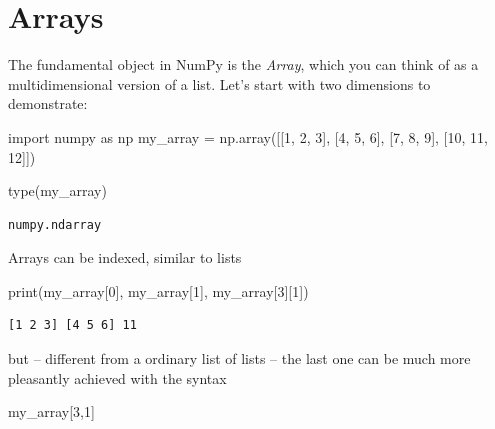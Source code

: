 \documentclass[
  letterpaper,
  DIV=11,
  numbers=noendperiod]{scrreprt}
\newenvironment{Shaded}{\begin{snugshade}}{\end{snugshade}}
\newcommand{\BuiltInTok}[1]{\textcolor[rgb]{0.00,0.23,0.31}{#1}}
\newcommand{\DecValTok}[1]{\textcolor[rgb]{0.68,0.00,0.00}{#1}}
\newcommand{\ImportTok}[1]{\textcolor[rgb]{0.00,0.46,0.62}{#1}}
\newcommand{\NormalTok}[1]{\textcolor[rgb]{0.00,0.23,0.31}{#1}}
\newcommand{\OperatorTok}[1]{\textcolor[rgb]{0.37,0.37,0.37}{#1}}
\theoremstyle{definition}
\theoremstyle{remark}
\begin{document}
\hypertarget{arrays}{%
\section{Arrays}\label{arrays}}

The fundamental object in NumPy is the \emph{Array}, which you can think
of as a multidimensional version of a list. Let's start with two
dimensions to demonstrate:

\begin{Shaded}
\begin{Highlighting}[]
\ImportTok{import}\NormalTok{ numpy }\ImportTok{as}\NormalTok{ np}
\NormalTok{my\_array }\OperatorTok{=}\NormalTok{ np.array([[}\DecValTok{1}\NormalTok{, }\DecValTok{2}\NormalTok{, }\DecValTok{3}\NormalTok{], [}\DecValTok{4}\NormalTok{, }\DecValTok{5}\NormalTok{, }\DecValTok{6}\NormalTok{], [}\DecValTok{7}\NormalTok{, }\DecValTok{8}\NormalTok{, }\DecValTok{9}\NormalTok{], [}\DecValTok{10}\NormalTok{, }\DecValTok{11}\NormalTok{, }\DecValTok{12}\NormalTok{]])}
\end{Highlighting}
\end{Shaded}

\begin{Shaded}
\begin{Highlighting}[]
\BuiltInTok{type}\NormalTok{(my\_array)}
\end{Highlighting}
\end{Shaded}

\begin{verbatim}
numpy.ndarray
\end{verbatim}

Arrays can be indexed, similar to lists

\begin{Shaded}
\begin{Highlighting}[]
\BuiltInTok{print}\NormalTok{(my\_array[}\DecValTok{0}\NormalTok{], my\_array[}\DecValTok{1}\NormalTok{], my\_array[}\DecValTok{3}\NormalTok{][}\DecValTok{1}\NormalTok{])}
\end{Highlighting}
\end{Shaded}

\begin{verbatim}
[1 2 3] [4 5 6] 11
\end{verbatim}

but -- different from a ordinary list of lists -- the last one can be
much more pleasantly achieved with the syntax

\begin{Shaded}
\begin{Highlighting}[]
\NormalTok{my\_array[}\DecValTok{3}\NormalTok{,}\DecValTok{1}\NormalTok{]}
\end{Highlighting}
\end{Shaded}
\end{document}
